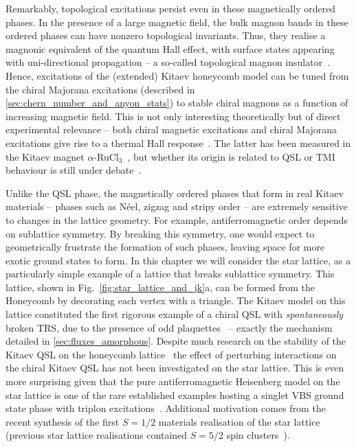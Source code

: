 Remarkably, topological excitations persist even in these magnetically ordered phases. In the presence of a large magnetic field, the bulk magnon bands in these ordered phases can have nonzero topological invariants. Thus, they realise a magnonic equivalent of the quantum Hall effect, with surface states appearing with uni-directional propagation -- a so-called topological magnon insulator~\cite{mcclarty_topological_2018,katsura_theory_2010,zhang_topological_2013,mook_edge_2014,mcclarty_topological_2022}. Hence, excitations of the (extended) Kitaev honeycomb model can be tuned from the chiral Majorana excitations (described in \textsection\ref{sec:chern_number_and_anyon_stats}) to stable chiral magnons as a function of increasing magnetic field. This is not only interesting theoretically but of direct experimental relevance -- both chiral magnetic excitations and chiral Majorana excitations give rise to a thermal Hall response~\cite{katsura_theory_2010,matsumoto_theoretical_2011}. The latter has been measured in the Kitaev magnet $\alpha$-RuCl$_3$~\cite{kasahara_majorana_2018,bruin_robustness_2022}, but whether its origin is related to QSL or TMI behaviour is still under debate~\cite{czajka_planar_2023,chern_sign_2021}.  

Unlike the QSL phase, the magnetically ordered phases that form in real Kitaev materials -- phases such as N\'eel, zigzag and stripy order -- are extremely sensitive to changes in the lattice geometry. For example, antiferromagnetic order depends on sublattice symmetry. By breaking this symmetry, one would expect to geometrically frustrate the formation of such phases, leaving space for more exotic ground states to form. In this chapter we will consider the star lattice, as a particularly simple example of a lattice that breaks sublattice symmetry. This lattice, shown in Fig.~\ref{fig:star_lattice_and_jk}a, can be formed from the Honeycomb by decorating each vertex with a triangle. The Kitaev model on this lattice constituted the first rigorous example of a chiral QSL with {\it spontaneously} broken TRS, due to the presence of odd plaquettes~\cite{yao_exact_2007} -- exactly the mechanism detailed in \textsection\ref{sec:fluxes_amorphous}. Despite much research on the stability of the Kitaev QSL on the honeycomb lattice~\cite{winter_models_2017,hermanns_physics_2018,trebst_kitaev_2022} the effect of perturbing interactions on the chiral Kitaev QSL has not been investigated on the star lattice. This is even more surprising given that the pure antiferromagnetic Heisenberg model on the star lattice is one of the rare established examples hosting a singlet VBS ground state phase with triplon excitations~\cite{richter_absence_2004,choy_classification_2009,yang_competing_2010, jahromi_spin-frac12_2018,jahromi_infinite_2018,ran_emergent_2018}. Additional motivation comes from the recent synthesis of the first $S=1/2$ materials realisation of the star lattice~\cite{sorolla_synthesis_2020,ji_dielectric_2022} (previous star lattice realisations contained $S=5/2$ spin clusters~\cite{zheng_star_2007}).  

